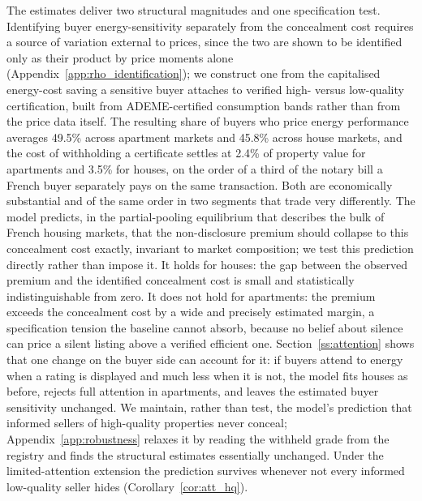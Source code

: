 The estimates deliver two structural magnitudes and one specification test. Identifying buyer
energy-sensitivity separately from the concealment cost requires a source of variation external
to prices, since the two are shown to be identified only as their product by price moments
alone (Appendix~\ref{app:rho_identification}); we construct one from the capitalised energy-cost
saving a sensitive buyer attaches to verified high- versus low-quality certification, built from
ADEME-certified consumption bands rather than from the price data itself. The resulting share of
buyers who price energy performance averages 49.5\% across apartment markets and 45.8\% across
house markets, and the cost of withholding a certificate settles at 2.4\% of property value for
apartments and 3.5\% for houses, on the order of a third of the notary bill a French buyer
separately pays on the same transaction. Both are economically substantial and of the
same order in two segments that trade very differently. The model predicts, in the partial-pooling
equilibrium that describes the bulk of French housing markets, that the non-disclosure premium
should collapse to this concealment cost exactly, invariant to market composition; we test this
prediction directly rather than impose it. It holds for houses: the gap between the observed
premium and the identified concealment cost is small and statistically indistinguishable from
zero. It does not hold for apartments: the premium exceeds the concealment cost by a wide and
precisely estimated margin, a specification tension the baseline cannot absorb, because no belief
about silence can price a silent listing above a verified efficient one.
Section~\ref{ss:attention} shows that one change on the buyer side can account for it: if buyers attend
to energy when a rating is displayed and much less when it is not, the model fits houses as before,
rejects full attention in apartments, and leaves the estimated buyer sensitivity unchanged.
We maintain, rather than test, the model's prediction that informed sellers of high-quality
properties never conceal; Appendix~\ref{app:robustness} relaxes it by reading the withheld grade
from the registry and finds the structural estimates essentially unchanged. Under the limited-attention
extension the prediction survives whenever not every informed low-quality seller hides (Corollary~\ref{cor:att_hq}).
